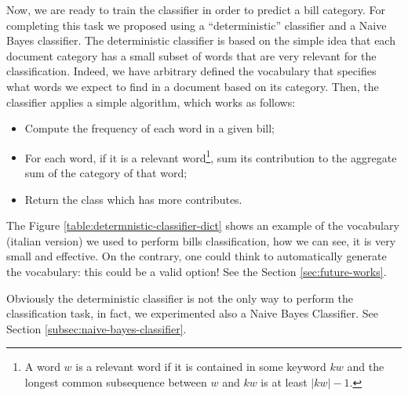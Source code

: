 \documentclass[10pt,twocolumn,letterpaper]{article}
\begin{document}
Now, we are ready to train the classifier in order to predict a bill
category. For completing this task we proposed using a
``deterministic'' classifier and a Naive Bayes classifier. The deterministic classifier is based on the
simple idea that each document category has a small subset of words
that are very relevant for the classification. Indeed, we have
arbitrary defined the vocabulary that specifies what words we expect
to find in a document based on its category. Then, the classifier
applies a simple algorithm, which works as follows:

\begin{itemize}
  \item Compute the frequency of each word in a given bill;
  \item For each word, if it is a relevant word\footnote{A word $w$ is
    a relevant word if it is contained in some keyword $kw$ and the
    longest common subsequence between $w$ and $kw$ is at least $|kw|
    - 1$.}, sum its contribution to the aggregate sum of the category
    of that word;
  \item Return the class which has more contributes.
\end{itemize}

The Figure \ref{table:determnistic-classifier-dict} shows an example
of the vocabulary (italian version) we used to perform bills
classification, how we can see, it is very small and effective.  On
the contrary, one could think to automatically generate the
vocabulary: this could be a valid option! See the Section
\ref{sec:future-works}.

Obviously the deterministic classifier is not the only way to perform
the classification task, in fact, we experimented also a Naive Bayes
Classifier. See Section \ref{subsec:naive-bayes-classifier}.
\end{document}
